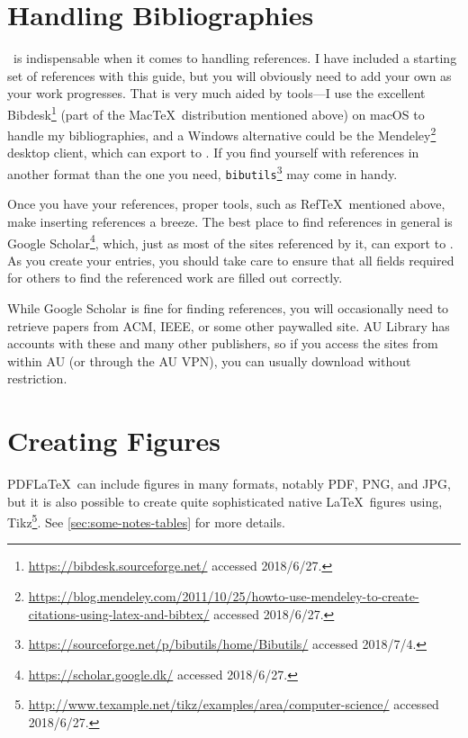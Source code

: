 \section*{Handling Bibliographies}
\label{sec:handl-bibl}

\mBibTeX\ is indispensable when it comes to handling references. I have
included a starting set of references with this guide, but you will
obviously need to add your own as your work progresses.  That is very
much aided by tools---I use the excellent
Bibdesk\footnote{\url{https://bibdesk.sourceforge.net/} accessed
  2018/6/27.} (part of the Mac\negthinspace\TeX\ distribution mentioned above) on
macOS to handle my bibliographies, and a Windows alternative could be
the
Mendeley\footnote{\url{https://blog.mendeley.com/2011/10/25/howto-use-mendeley-to-create-citations-using-latex-and-bibtex/}
  accessed 2018/6/27.}  desktop client, which can export to
\mBibTeX. If you find yourself with references in another format than
the one you need,
\texttt{bibutils}\footnote{\url{https://sourceforge.net/p/bibutils/home/Bibutils/}
  accessed 2018/7/4.} may come in handy.

Once you have your references, proper tools, such as Ref\TeX\
mentioned above, make inserting references a breeze.  The best place
to find references in general is Google
Scholar\footnote{\url{https://scholar.google.dk/} accessed
  2018/6/27.}, which, just as most of the sites referenced by it, can
export to \mBibTeX. As you create your entries,
you should take care to ensure that all fields required for others to
find the referenced work are filled out correctly.

While Google Scholar is fine for finding references, you will
occasionally need to retrieve papers from ACM, IEEE, or some other
paywalled site.  AU Library has accounts with these and many other
publishers, so if you access the sites from within AU (or through the
AU VPN), you can usually download without restriction.

\section*{Creating Figures}
\label{sec:creating-figures}

PDF\LaTeX\ can include figures in many formats, notably \acs{PDF},
\acs{PNG}, and \acs{JPG}, but it is also possible to create quite
sophisticated native \LaTeX\ figures using, \eg
Tikz\footnote{\url{http://www.texample.net/tikz/examples/area/computer-science/}
  accessed 2018/6/27.}. See \autoref{sec:some-notes-tables} for more
details.

